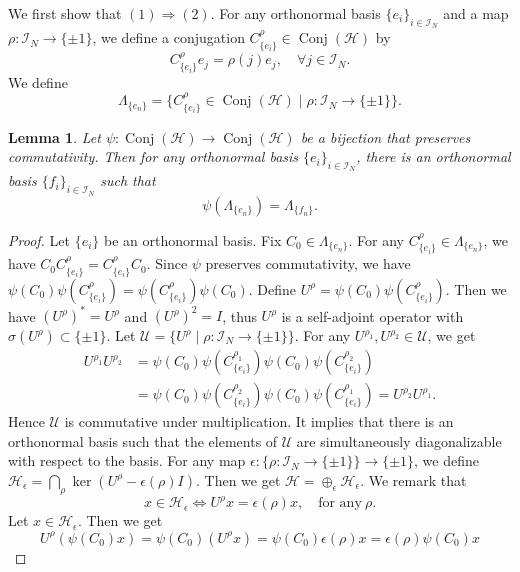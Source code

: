 \documentclass[11pt]{amsart}
\newtheorem{lemma}[theorem]{Lemma}
\theoremstyle{remark}
\newcommand{\cH}{{\mathcal{H}}}
\newcommand{\Conj}{\operatorname{Conj}(\cH)}
\begin{document}
We first show that $(1)\Rightarrow(2)$.  For any orthonormal basis $\{e_i\}_{i \in \mathcal{I}_N}$ and a map $\rho: \mathcal{I}_N \to \{\pm1\} $, we define a conjugation $C_{\{e_i\}}^{\rho} \in \Conj$ by 
\[
C_{\{e_i\}}^{\rho}e_j= \rho(j) e_j, \quad \forall j \in \mathcal{I}_N.
\]
We define \[
\Lambda_{\{e_n\}}=\{C_{\{e_i\}}^{\rho} \in \Conj \mid \rho: \mathcal{I}_N \to \{\pm1\} \}.
\]
\begin{lemma}\label{commutative}
 Let $\psi: \Conj \to \Conj$ be a bijection that preserves commutativity. Then for any orthonormal basis $\{e_i\}_{i \in \mathcal{I}_N}$, there is an orthonormal basis $\{f_i\}_{i \in \mathcal{I}_N}$ such that 
 \[
 \psi(\Lambda_{\{e_n\}})=\Lambda_{\{f_n\}}.
 \]
\end{lemma}
\begin{proof}
   Let $\{e_i\}$ be an orthonormal basis.  Fix $C_0 \in \Lambda_{\{e_n\}}$. For any $C_{\{e_i\}}^{\rho} \in \Lambda_{\{e_n\}}$, we have $C_0C_{\{e_i\}}^{\rho}=C_{\{e_i\}}^{\rho}C_0$. Since $\psi$ preserves commutativity,  we have $\psi(C_0)\psi(C_{\{e_i\}}^{\rho})=\psi(C_{\{e_i\}}^{\rho})\psi(C_0)$. Define $U^{\rho}=\psi(C_0)\psi(C_{\{e_i\}}^{\rho})$. Then we have $(U^{\rho})^*=U^{\rho}$ and $(U^{\rho})^2=I$, thus $U^{\rho}$ is a self-adjoint operator with  $\sigma(U^{\rho}) \subset \{\pm 1\}$.  Let $\mathcal{U}=\{U^{\rho} \mid \rho: \mathcal{I}_N \to \{\pm1\} \}$. For any $U^{\rho_1}, U^{\rho_2} \in \mathcal{U}$, we get
   \[
   \begin{split}
        U^{\rho_1}U^{\rho_2}&=\psi(C_0)\psi(C_{\{e_i\}}^{\rho_1})\psi(C_0)\psi(C_{\{e_i\}}^{\rho_2})\\&=\psi(C_0)\psi(C_{\{e_i\}}^{\rho_2})\psi(C_0)\psi(C_{\{e_i\}}^{\rho_1})=U^{\rho_2}U^{\rho_1}.
   \end{split}
   \]
Hence $\mathcal{U}$ is commutative under multiplication. It implies that there is an orthonormal basis such that the elements of $\mathcal{U}$ are simultaneously diagonalizable with respect to the basis. For any map $\epsilon: \{ \rho: \mathcal{I}_N \to \{\pm1\}\} \to  \{\pm1\}$, we define $\cH_{\epsilon}=\bigcap_{\rho}\ker(U^{\rho}-\epsilon(\rho)I)$. Then we get $\cH=\oplus_{\epsilon} \cH_{\epsilon}$. We remark that
\begin{equation*}%
    x \in \cH_{\epsilon} \Longleftrightarrow U^{\rho}x=\epsilon(\rho)x, \quad \text{for any}\ \rho.
\end{equation*}
Let $x \in \cH_{\epsilon}$. Then we get
\[
U^{\rho}(\psi(C_0)x)=\psi(C_0)(U^{\rho}x)=\psi(C_0)\epsilon(\rho)x=\epsilon(\rho)\psi(C_0)x
\]
\end{proof}
\end{document}
